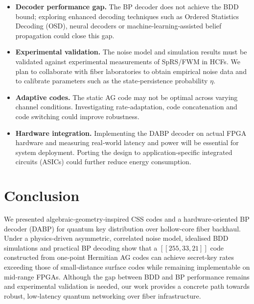 \documentclass[conference]{IEEEtran}
\begin{document}
    \begin{itemize}[leftmargin=*]
      \item \textbf{Decoder performance gap.}  The BP decoder does not achieve the BDD bound; exploring enhanced 
decoding techniques such as Ordered Statistics Decoding (OSD), neural decoders or machine‑learning‑assisted belief 
propagation could close this gap.
      \item \textbf{Experimental validation.}  The noise model and simulation results must be validated against 
experimental measurements of SpRS/FWM in HCFs.  We plan to collaborate with fiber laboratories to obtain empirical noise
 data and to calibrate parameters such as the state‑persistence probability $\eta$.
      \item \textbf{Adaptive codes.}  The static AG code may not be optimal across varying channel conditions.  
Investigating rate‑adaptation, code concatenation and code switching could improve robustness.
      \item \textbf{Hardware integration.}  Implementing the DABP decoder on actual FPGA hardware and measuring 
real‑world latency and power will be essential for system deployment.  Porting the design to application‑specific 
integrated circuits (ASICs) could further reduce energy consumption.
    \end{itemize}

    \section{Conclusion}

    We presented algebraic‑geometry‑inspired CSS codes and a hardware‑oriented BP decoder (DABP) for quantum key 
distribution over hollow‑core fiber backhaul.  Under a physics‑driven asymmetric, correlated noise model, idealised BDD 
simulations and practical BP decoding show that a $[[255,33,21]]$ code constructed from one‑point Hermitian AG codes can
  achieve secret‑key rates exceeding those of small‑distance surface codes while remaining implementable on mid‑range 
FPGAs.  Although the gap between BDD and BP performance remains and experimental validation is needed, our work provides
  a concrete path towards robust, low‑latency quantum networking over fiber infrastructure.


    
    

    
\end{document}
